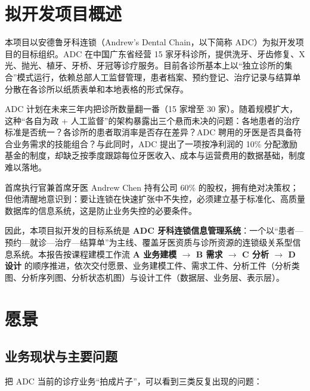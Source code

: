 \documentclass[11pt,a4paper]{ctexart}
\begin{document}
\thispagestyle{fancy}
\setcounter{tocdepth}{2}
{\linespread{1.02}\selectfont
\tableofcontents}
\newpage

\section{拟开发项目概述}

本项目以安德鲁牙科连锁（Andrew's Dental Chain，以下简称 ADC）为拟开发项目的目标组织。ADC 在中国广东省经营 15 家牙科诊所，提供洗牙、牙齿修复、X 光、抛光、植牙、牙桥、牙冠等诊疗服务。目前各诊所基本上以“独立诊所的集合”模式运行，依赖总部人工监督管理，患者档案、预约登记、治疗记录与结算单分散在各诊所以纸质表单和本地表格的形式保存。

ADC 计划在未来三年内把诊所数量翻一番（15 家增至 30 家）。随着规模扩大，这种“各自为政 + 人工监督”的架构暴露出三个悬而未决的问题：各地患者的治疗标准是否统一？各诊所的患者取消率是否存在差异？ADC 聘用的牙医是否具备符合业务需求的技能组合？与此同时，ADC 提出了一项按净利润的 10\% 分配激励基金的制度，却缺乏按季度跟踪每位牙医收入、成本与运营费用的数据基础，制度难以落地。

首席执行官兼首席牙医 Andrew Chen 持有公司 60\% 的股权，拥有绝对决策权；但他清醒地意识到：要让连锁在快速扩张中不失控，必须建立基于标准化、高质量数据库的信息系统，这是防止业务失控的必要条件。

因此，本项目拟开发的目标系统是 \textbf{ADC 牙科连锁信息管理系统}：一个以“患者—预约—就诊—治疗—结算单”为主线、覆盖牙医资质与诊所资源的连锁级关系型信息系统。本报告按课程建模工作流 \textbf{A 业务建模 $\rightarrow$ B 需求 $\rightarrow$ C 分析 $\rightarrow$ D 设计} 的顺序推进，依次交付愿景、业务建模工件、需求工件、分析工件（分析类图、分析序列图、分析状态机图）与设计工件（数据层、业务层、表示层）。

\section{愿景}

\subsection{业务现状与主要问题}

把 ADC 当前的诊疗业务“拍成片子”，可以看到三类反复出现的问题：
\end{document}
